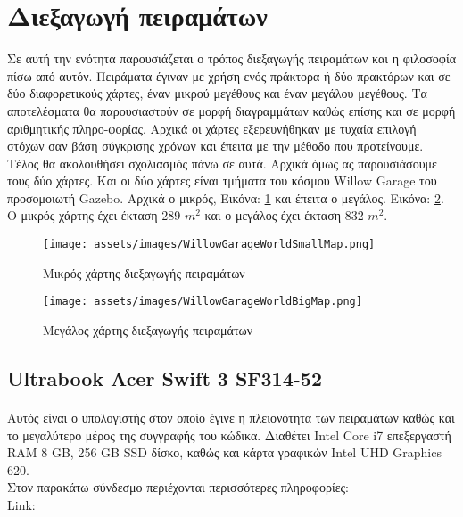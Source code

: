 \section{Διεξαγωγή πειραμάτων}

Σε αυτή την ενότητα παρουσιάζεται ο τρόπος διεξαγωγής πειραμάτων και η φιλοσοφία πίσω από αυτόν. Πειράματα έγιναν με χρήση ενός πράκτορα ή δύο πρακτόρων και σε δύο διαφορετικούς χάρτες, έναν μικρού μεγέθους και έναν μεγάλου μεγέθους. Τα αποτελέσματα θα παρουσιαστούν σε μορφή διαγραμμάτων καθώς επίσης και σε μορφή αριθμητικής πληρο-φορίας. Αρχικά οι χάρτες εξερευνήθηκαν με τυχαία επιλογή στόχων σαν βάση σύγκρισης χρόνων και έπειτα με την μέθοδο που προτείνουμε. Τέλος θα ακολουθήσει σχολιασμός πάνω σε αυτά. Αρχικά όμως ας παρουσιάσουμε τους δύο χάρτες. Και οι δύο χάρτες είναι τμήματα του κόσμου Willow Garage του προσομοιωτή Gazebo. Αρχικά ο μικρός, Εικόνα: \ref{fig:Small map} και έπειτα ο μεγάλος. Εικόνα: \ref{fig:Big map}.
Ο μικρός χάρτης έχει έκταση 289 $m^2$ και ο μεγάλος έχει έκταση  832 $ m^2 $.

\begin{figure}[!h]
	\centering
	\texttt{[image: assets/images/WillowGarageWorldSmallMap.png]}
	\caption{Μικρός χάρτης διεξαγωγής πειραμάτων}
	\label{fig:Small map}
\end{figure}

\begin{figure}[!h]
	\centering
	\texttt{[image: assets/images/WillowGarageWorldBigMap.png]}
	\caption{Μεγάλος χάρτης διεξαγωγής πειραμάτων}
	\label{fig:Big map}
\end{figure}

\newpage

\subsection{Ultrabook Acer Swift 3 SF314-52}

\paragraph{}Αυτός είναι ο υπολογιστής στον οποίο έγινε η πλειονότητα των πειραμάτων καθώς και το μεγαλύτερο μέρος της συγγραφής του κώδικα. Διαθέτει Intel Core i7 επεξεργαστή RAM 8 GB, 256 GB SSD δίσκο, καθώς και κάρτα γραφικών Intel UHD Graphics 620. \\
Στον παρακάτω σύνδεσμο περιέχονται περισσότερες πληροφορίες: \\
Link: \href{https://www.acer.com/ac/en/US/content/series/swift3}{\color{blue}{Acer Swift 3}}

